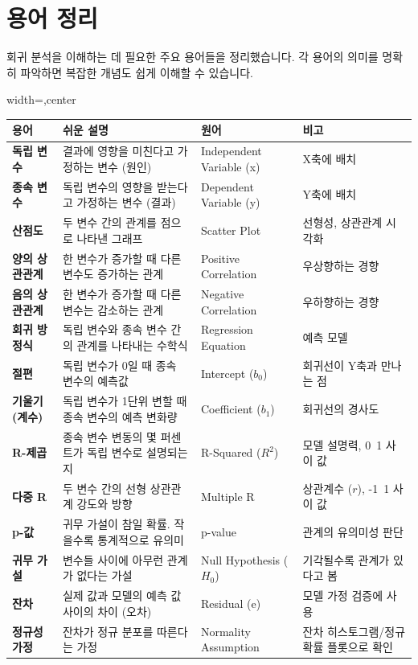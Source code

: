 \documentclass[11pt,a4paper]{article}
\begin{document}
\newpage
\section*{용어 정리}
회귀 분석을 이해하는 데 필요한 주요 용어들을 정리했습니다. 각 용어의 의미를 명확히 파악하면 복잡한 개념도 쉽게 이해할 수 있습니다.

\begin{adjustbox}{width=\textwidth,center}
\begin{tabular}{llll}
\toprule
\textbf{용어} & \textbf{쉬운 설명} & \textbf{원어} & \textbf{비고} \\
\midrule
\textbf{독립 변수} & 결과에 영향을 미친다고 가정하는 변수 (원인) & Independent Variable (x) & X축에 배치 \\
\textbf{종속 변수} & 독립 변수의 영향을 받는다고 가정하는 변수 (결과) & Dependent Variable (y) & Y축에 배치 \\
\textbf{산점도} & 두 변수 간의 관계를 점으로 나타낸 그래프 & Scatter Plot & 선형성, 상관관계 시각화 \\
\textbf{양의 상관관계} & 한 변수가 증가할 때 다른 변수도 증가하는 관계 & Positive Correlation & 우상향하는 경향 \\
\textbf{음의 상관관계} & 한 변수가 증가할 때 다른 변수는 감소하는 관계 & Negative Correlation & 우하향하는 경향 \\
\textbf{회귀 방정식} & 독립 변수와 종속 변수 간의 관계를 나타내는 수학식 & Regression Equation & 예측 모델 \\
\textbf{절편} & 독립 변수가 0일 때 종속 변수의 예측값 & Intercept ($b_0$) & 회귀선이 Y축과 만나는 점 \\
\textbf{기울기 (계수)} & 독립 변수가 1단위 변할 때 종속 변수의 예측 변화량 & Coefficient ($b_1$) & 회귀선의 경사도 \\
\textbf{R-제곱} & 종속 변수 변동의 몇 퍼센트가 독립 변수로 설명되는지 & R-Squared ($R^2$) & 모델 설명력, 0~1 사이 값 \\
\textbf{다중 R} & 두 변수 간의 선형 상관관계 강도와 방향 & Multiple R & 상관계수 ($r$), -1~1 사이 값 \\
\textbf{p-값} & 귀무 가설이 참일 확률. 작을수록 통계적으로 유의미 & p-value & 관계의 유의미성 판단 \\
\textbf{귀무 가설} & 변수들 사이에 아무런 관계가 없다는 가설 & Null Hypothesis ($H_0$) & 기각될수록 관계가 있다고 봄 \\
\textbf{잔차} & 실제 값과 모델의 예측 값 사이의 차이 (오차) & Residual (e) & 모델 가정 검증에 사용 \\
\textbf{정규성 가정} & 잔차가 정규 분포를 따른다는 가정 & Normality Assumption & 잔차 히스토그램/정규 확률 플롯으로 확인 \\

\end{tabular}
\end{adjustbox}
\end{document}
